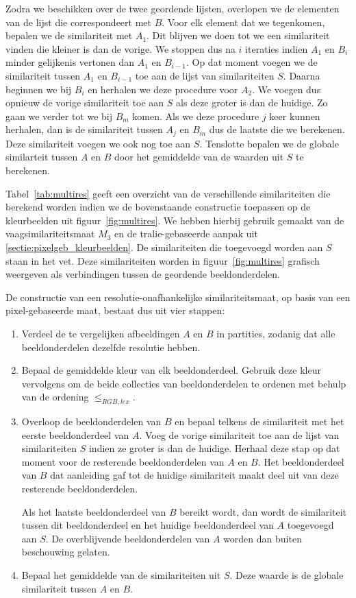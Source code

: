 Zodra we beschikken over de twee geordende lijsten, overlopen we de elementen van de 
lijst die correspondeert met $B$. Voor
elk element dat we tegenkomen, bepalen we de similariteit met $A_1$. Dit blijven we doen
tot we een similariteit vinden die kleiner is dan de vorige. We stoppen dus na $i$ iteraties 
indien $A_1$ en $B_i$ minder gelijkenis vertonen dan $A_1$ en $B_{i-1}$. Op dat moment voegen
we de similariteit tussen $A_1$ en $B_{i-1}$ toe aan de lijst van similariteiten $S$. Daarna
beginnen we bij $B_i$ en herhalen we deze procedure voor $A_2$. We voegen dus opnieuw de vorige
similariteit toe aan $S$ als deze groter is dan de huidige. Zo gaan we verder tot we bij
$B_m$ komen. Als we deze procedure $j$ keer kunnen herhalen, dan
is de similariteit tussen $A_j$ en $B_m$ dus de laatste die we berekenen. Deze similariteit
voegen we ook nog toe aan $S$. Tenslotte bepalen we de globale similarteit tussen $A$ en $B$ 
door het gemiddelde van de waarden uit $S$ te berekenen.

Tabel~\ref{tab:multires} geeft een overzicht van de 
verschillende similariteiten die berekend worden indien we de bovenstaande constructie
toepassen op de kleurbeelden uit figuur~\ref{fig:multires}. We hebben hierbij gebruik gemaakt 
van de vaagsimilariteitsmaat $M_3$ en de tralie-gebaseerde aanpak uit \ref{sectie:pixelgeb_kleurbeelden}.
De similariteiten die  
toegevoegd worden aan $S$ staan in het vet. Deze similariteiten 
worden in figuur~\ref{fig:multires} grafisch weergeven als verbindingen tussen de
geordende beeldonderdelen.

De constructie van een resolutie-onafhankelijke similariteitsmaat, 
op basis van een pixel-gebaseerde maat, bestaat dus uit vier stappen:
\begin{enumerate}
\item Verdeel de te vergelijken afbeeldingen $A$ en $B$
in partities, zodanig dat alle beeldonderdelen dezelfde resolutie hebben.
\item Bepaal de gemiddelde kleur van elk beeldonderdeel. Gebruik deze kleur vervolgens
om de beide collecties van beeldonderdelen te ordenen met behulp van de ordening $\leq_{RGB,lex}$.
\item Overloop de beeldonderdelen van $B$ en bepaal telkens de similariteit met het eerste 
beeldonderdeel van $A$. Voeg de vorige similariteit toe aan de lijst van similariteiten $S$
indien ze groter is dan de huidige. Herhaal deze stap op dat moment voor de resterende
beeldonderdelen van $A$ en $B$. Het 
beeldonderdeel van $B$ dat aanleiding gaf tot de huidige similariteit maakt deel uit van
deze resterende beeldonderdelen.

Als het laatste beeldonderdeel van $B$ bereikt wordt, dan wordt de similariteit tussen dit
beeldonderdeel en het huidige beeldonderdeel van $A$ toegevoegd aan $S$. De overblijvende
beeldonderdelen van $A$ worden dan buiten beschouwing gelaten. 
\item Bepaal het gemiddelde van de similariteiten uit $S$. Deze waarde is de globale similariteit tussen
$A$ en $B$.
\end{enumerate}

